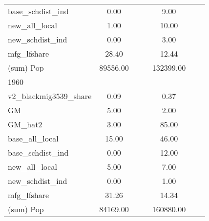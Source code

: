 \begin{table}[htbp]
\begin{tabular}{l*{2}{ccc}}
base\_schdist\_ind    &        0.00&            &            &        9.00&            &            \\
new\_all\_local       &        1.00&            &            &       10.00&            &            \\
new\_schdist\_ind     &        0.00&            &            &        3.00&            &            \\
mfg\_lfshare         &       28.40&            &            &       12.44&            &            \\
(sum) Pop           &    89556.00&            &            &   132399.00&            &            \\
\midrule
1960                &            &            &            &            &            &            \\
v2\_blackmig3539\_share&        0.09&            &            &        0.37&            &            \\
GM                  &        5.00&            &            &        2.00&            &            \\
GM\_hat2             &        3.00&            &            &       85.00&            &            \\
base\_all\_local      &       15.00&            &            &       46.00&            &            \\
base\_schdist\_ind    &        0.00&            &            &       12.00&            &            \\
new\_all\_local       &        5.00&            &            &        7.00&            &            \\
new\_schdist\_ind     &        0.00&            &            &        1.00&            &            \\
mfg\_lfshare         &       31.26&            &            &       14.34&            &            \\
(sum) Pop           &    84169.00&            &            &   160880.00&            &            \\
\bottomrule
\end{tabular}
\end{table}
